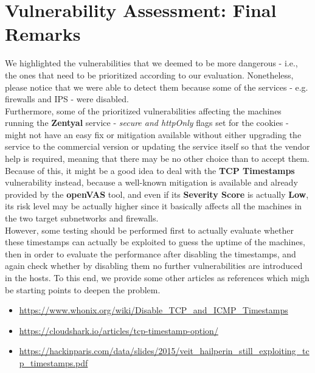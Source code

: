 \section{Vulnerability Assessment: Final Remarks}
We highlighted the vulnerabilities that we deemed to be more dangerous - i.e., the ones that need to be prioritized according to our evaluation. Nonetheless, please notice that we were able to detect them because some of the services - e.g. firewalls and IPS - were disabled.\\
Furthermore, some of the prioritized vulnerabilities affecting the machines running the \textbf{Zentyal} service - \textit{secure and httpOnly} flags set for the cookies - might not have an easy fix or mitigation available without either upgrading the service to the commercial version or updating the service itself so that the vendor help is required, meaning that there may be no other choice than to accept them. Because of this, it might be a good idea to deal with the \textbf{TCP Timestamps} vulnerability instead, because a well-known mitigation is available and already provided by the \textbf{openVAS} tool, and even if its \textbf{Severity Score} is actually \textbf{Low}, its risk level may be actually higher since it basically affects all the machines in the two target subnetworks and firewalls.\\
However, some testing should be performed first to actually evaluate whether these timestamps can actually be exploited to guess the uptime of the machines, then in order to evaluate the performance after disabling the timestamps, and again check whether by disabling them no further vulnerabilities are introduced in the hosts. To this end, we provide some other articles as references which migh be starting points to deepen the problem.
\begin{itemize}
\item \url{https://www.whonix.org/wiki/Disable_TCP_and_ICMP_Timestamps}
\item \url{https://cloudshark.io/articles/tcp-timestamp-option/}
\item \url{https://hackinparis.com/data/slides/2015/veit_hailperin_still_exploiting_tcp_timestamps.pdf}
\end{itemize}

